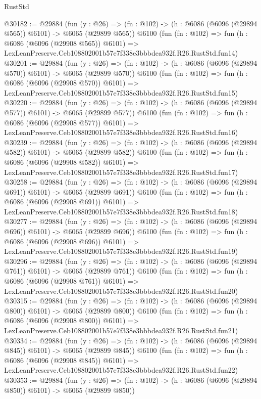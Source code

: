 \begin{lexlean}{RustStd}
\begin{coremodule}
@30182 := @29884
    (fun (y : @26) => (fn : @102) -> (h : @6086 (@6096 (@29894 @565)) @6101) -> @6065 (@29899 @565))
    @6100
    (fun (fn : @102) =>
    fun (h : @6086 (@6096 (@29908 @565)) @6101) =>
    LexLeanPreserve.Ceb108802001b57e7f338e3bbbdea932f.R26.RustStd.fun14)
@30201 := @29884
    (fun (y : @26) => (fn : @102) -> (h : @6086 (@6096 (@29894 @570)) @6101) -> @6065 (@29899 @570))
    @6100
    (fun (fn : @102) =>
    fun (h : @6086 (@6096 (@29908 @570)) @6101) =>
    LexLeanPreserve.Ceb108802001b57e7f338e3bbbdea932f.R26.RustStd.fun15)
@30220 := @29884
    (fun (y : @26) => (fn : @102) -> (h : @6086 (@6096 (@29894 @577)) @6101) -> @6065 (@29899 @577))
    @6100
    (fun (fn : @102) =>
    fun (h : @6086 (@6096 (@29908 @577)) @6101) =>
    LexLeanPreserve.Ceb108802001b57e7f338e3bbbdea932f.R26.RustStd.fun16)
@30239 := @29884
    (fun (y : @26) => (fn : @102) -> (h : @6086 (@6096 (@29894 @582)) @6101) -> @6065 (@29899 @582))
    @6100
    (fun (fn : @102) =>
    fun (h : @6086 (@6096 (@29908 @582)) @6101) =>
    LexLeanPreserve.Ceb108802001b57e7f338e3bbbdea932f.R26.RustStd.fun17)
@30258 := @29884
    (fun (y : @26) => (fn : @102) -> (h : @6086 (@6096 (@29894 @691)) @6101) -> @6065 (@29899 @691))
    @6100
    (fun (fn : @102) =>
    fun (h : @6086 (@6096 (@29908 @691)) @6101) =>
    LexLeanPreserve.Ceb108802001b57e7f338e3bbbdea932f.R26.RustStd.fun18)
@30277 := @29884
    (fun (y : @26) => (fn : @102) -> (h : @6086 (@6096 (@29894 @696)) @6101) -> @6065 (@29899 @696))
    @6100
    (fun (fn : @102) =>
    fun (h : @6086 (@6096 (@29908 @696)) @6101) =>
    LexLeanPreserve.Ceb108802001b57e7f338e3bbbdea932f.R26.RustStd.fun19)
@30296 := @29884
    (fun (y : @26) => (fn : @102) -> (h : @6086 (@6096 (@29894 @761)) @6101) -> @6065 (@29899 @761))
    @6100
    (fun (fn : @102) =>
    fun (h : @6086 (@6096 (@29908 @761)) @6101) =>
    LexLeanPreserve.Ceb108802001b57e7f338e3bbbdea932f.R26.RustStd.fun20)
@30315 := @29884
    (fun (y : @26) => (fn : @102) -> (h : @6086 (@6096 (@29894 @800)) @6101) -> @6065 (@29899 @800))
    @6100
    (fun (fn : @102) =>
    fun (h : @6086 (@6096 (@29908 @800)) @6101) =>
    LexLeanPreserve.Ceb108802001b57e7f338e3bbbdea932f.R26.RustStd.fun21)
@30334 := @29884
    (fun (y : @26) => (fn : @102) -> (h : @6086 (@6096 (@29894 @845)) @6101) -> @6065 (@29899 @845))
    @6100
    (fun (fn : @102) =>
    fun (h : @6086 (@6096 (@29908 @845)) @6101) =>
    LexLeanPreserve.Ceb108802001b57e7f338e3bbbdea932f.R26.RustStd.fun22)
@30353 := @29884
    (fun (y : @26) => (fn : @102) -> (h : @6086 (@6096 (@29894 @850)) @6101) -> @6065 (@29899 @850))

\end{coremodule}
\end{lexlean}
